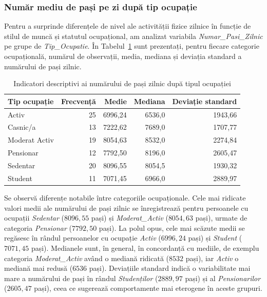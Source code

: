 \documentclass[12pt,a4paper]{report}
\begin{document}
\subsubsection{Număr mediu de pași pe zi după tip ocupație}

Pentru a surprinde diferențele de nivel ale activității fizice zilnice în funcție de stilul de muncă și statutul ocupațional, am analizat variabila \textit{Numar\_Pasi\_Zilnic} pe grupe de \textit{Tip\_Ocupatie}. În Tabelul~\ref{tab:pasi-ocupatie} sunt prezentați, pentru fiecare categorie ocupațională, numărul de observații, media, mediana și deviația standard a numărului de pași zilnic.

\begin{table}[h!]
    \centering
    \caption{Indicatori descriptivi ai numărului de pași zilnic după tipul ocupației}
    \label{tab:pasi-ocupatie}
    \begin{tabular}{l r r r r}
        \hline
        \textbf{Tip ocupație} & \textbf{Frecvență} & \textbf{Medie} & \textbf{Mediana} & \textbf{Deviație standard} \\
        \hline
        Activ         & 25 & 6996{,}24 & 6536{,}0 & 1943{,}66 \\
        Casnic/a      & 13 & 7222{,}62 & 7689{,}0 & 1707{,}77 \\
        Moderat Activ & 19 & 8054{,}63 & 8532{,}0 & 2274{,}84 \\
        Pensionar     & 12 & 7792{,}50 & 8196{,}0 & 2605{,}47 \\
        Sedentar      & 20 & 8096{,}55 & 8054{,}5 & 1930{,}32 \\
        Student       & 11 & 7071{,}45 & 6966{,}0 & 2889{,}97 \\
        \hline
    \end{tabular}
\end{table}

Se observă diferențe notabile între categoriile ocupaționale. Cele mai ridicate valori medii ale numărului de pași zilnic se înregistrează pentru persoanele cu ocupații \textit{Sedentar} (\(8096{,}55\) pași) și \textit{Moderat\_Activ} (\(8054{,}63\) pași), urmate de categoria \textit{Pensionar} (\(7792{,}50\) pași). La polul opus, cele mai scăzute medii se regăsesc în rândul persoanelor cu ocupație \textit{Activ} (\(6996{,}24\) pași) și \textit{Student} (\(7071{,}45\) pași). Medianele sunt, în general, în concordanță cu mediile, de exemplu categoria \textit{Moderat\_Activ} având o mediană ridicată (\(8532\) pași), iar \textit{Activ} o mediană mai redusă (\(6536\) pași). Deviațiile standard indică o variabilitate mai mare a numărului de pași în rândul \textit{Studenților} (\(2889{,}97\) pași) și al \textit{Pensionarilor} (\(2605{,}47\) pași), ceea ce sugerează comportamente mai eterogene în aceste grupuri.
\end{document}
